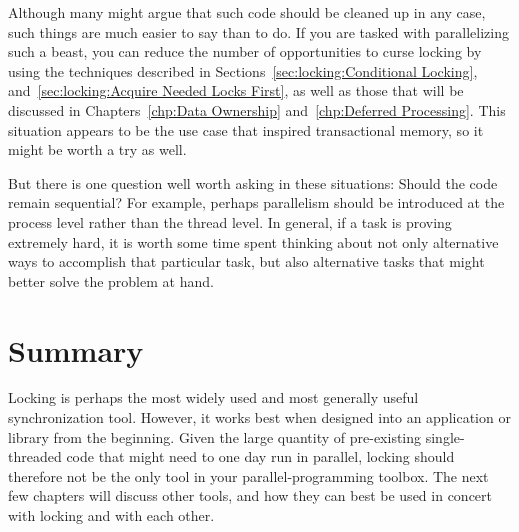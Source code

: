 Although many might argue that such code should be cleaned up in any
case, such things are much easier to say than to do.
If you are tasked with parallelizing such a beast, you can reduce the
number of opportunities to curse locking by using the techniques
described in
Sections~\ref{sec:locking:Conditional Locking},
and~\ref{sec:locking:Acquire Needed Locks First},
as well as those that will be discussed in
Chapters~\ref{chp:Data Ownership}
and~\ref{chp:Deferred Processing}.
This situation appears to be the use case that inspired transactional
memory, so it might be worth a try as well.

But there is one question well worth asking in these situations:
Should the code remain sequential?
For example, perhaps parallelism should be introduced at the process level
rather than the thread level.
In general, if a task is proving extremely hard, it is worth some time
spent thinking about not only alternative ways to accomplish that
particular task, but also alternative tasks that might better solve
the problem at hand.

\section{Summary}
\label{sec:locking:Summary}

Locking is perhaps the most widely used and most generally useful
synchronization tool.
However, it works best when designed into an application
or library from the beginning.
Given the large quantity of pre-existing single-threaded code that might
need to one day run in parallel, locking should therefore not be the
only tool in your parallel-programming toolbox.
The next few chapters will discuss other tools, and how they can best
be used in concert with locking and with each other.
